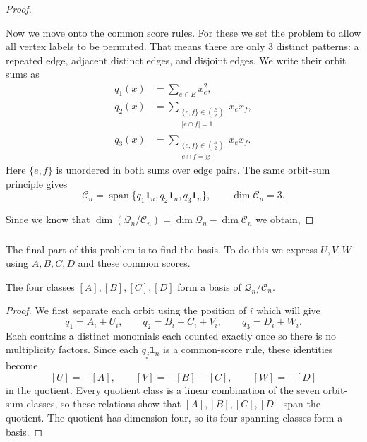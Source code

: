 \documentclass[11pt]{scrartcl}
\begin{document}
\begin{soln}
\begin{proof}
        \begin{subproof}
			Now we move onto the common score rules. For
			these we set the problem to allow all vertex labels to be
            permuted. That means there are only $3$ distinct patterns:
			 a repeated edge,
            adjacent distinct edges, and disjoint edges.
			We write their orbit sums as
            \begin{align*}
                q_1(x)&=\sum_{e\in E}x_e^2,\\
                q_2(x)&=
                \sum_{\substack{\{e,f\}\in\binom{E}{2}\\
                                |e\cap f|=1}}x_ex_f,\\
                q_3(x)&=
                \sum_{\substack{\{e,f\}\in\binom{E}{2}\\
                                e\cap f=\varnothing}}x_ex_f.
            \end{align*}
            Here $\{e,f\}$ is unordered in both sums over edge pairs.
            The same orbit-sum principle gives
            \[
            \mathcal C_n
            =\operatorname{span}
            \{q_1\mathbf1_n,q_2\mathbf1_n,q_3\mathbf1_n\},
            \qquad
            \dim\mathcal C_n=3.
            \]
        \end{subproof}

        Since we know that $\dim(\mathcal Q_n/\mathcal C_n)=\dim\mathcal Q_n-\dim\mathcal C_n$ we obtain, 
    \end{proof}

    \subsubsection*{}

    The final part of this problem is to find the basis. 
	To do this we express $U,V,W$ using
    $A,B,C,D$ and these common scores.

    \begin{claim*}
        The four classes $[A],[B],[C],[D]$ form a basis of
        $\mathcal Q_n/\mathcal C_n$.
    \end{claim*}

    \begin{proof}
		We first separate each orbit using the position of 
		$i$ which will give
        \[
        q_1=A_i+U_i,\qquad
        q_2=B_i+C_i+V_i,\qquad
        q_3=D_i+W_i.
        \]
		Each contains a distinct monomials each counted exactly once 
		so there is no multiplicity factors.
        Since each $q_j\mathbf1_n$ is a common-score rule, these
        identities become
        \[
        [U]=-[A],\qquad
        [V]=-[B]-[C],\qquad
        [W]=-[D]
        \]
        in the quotient.
        Every quotient class is a linear combination of the seven
        orbit-sum classes, so these relations show that
        $[A],[B],[C],[D]$ span the quotient.
        The quotient has dimension four, so its four spanning classes
        form a basis.
    \end{proof}


\end{soln}
\end{document}
